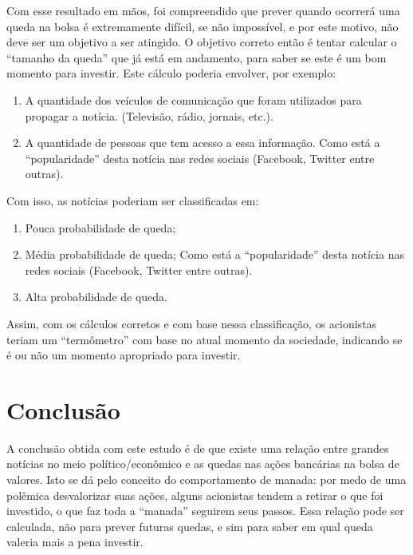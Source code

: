 \documentclass{sigchi}
\begin{document}
Com esse resultado em mãos, foi compreendido que prever quando ocorrerá uma queda na bolsa é extremamente difícil, se não impossível, e por este motivo, não deve ser um objetivo a ser atingido. O objetivo correto então é tentar calcular o “tamanho da queda” que já está em andamento, para saber se este é um bom momento para investir. Este cálculo poderia envolver, por exemplo:
\begin{enumerate}
\item A quantidade dos veículos de comunicação que foram utilizados para propagar a notícia. (Televisão, rádio, jornais, etc.).

\item A quantidade de pessoas que tem acesso a essa informação.
Como está a “popularidade” desta notícia nas redes sociais (Facebook, Twitter entre outras).
\end{enumerate}


Com isso, as notícias poderiam ser classificadas em: 
\begin{enumerate}
	\item Pouca probabilidade de queda;
	
	\item Média probabilidade de queda;
	Como está a “popularidade” desta notícia nas redes sociais (Facebook, Twitter entre outras).
	\item Alta probabilidade de queda.
\end{enumerate}



Assim, com os cálculos corretos e com base nessa classificação, os acionistas teriam um “termômetro” com base no atual momento da sociedade, indicando se é ou não um momento apropriado para investir.

\section{Conclusão}

A conclusão obtida com este estudo é de que existe uma relação entre grandes notícias no meio político/econômico e as quedas nas ações bancárias na bolsa de valores. Isto se dá pelo conceito do comportamento de manada: por medo de uma polêmica desvalorizar suas ações, alguns acionistas tendem a retirar o que foi investido, o que faz toda a “manada” seguirem seus passos. Essa relação pode ser calculada, não para prever futuras quedas, e sim para saber em qual queda valeria mais a pena investir.


\balance{}



\end{document}
